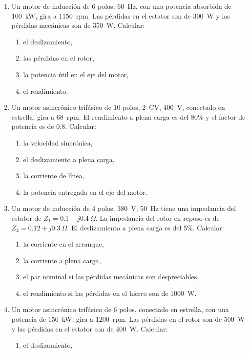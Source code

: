 \documentclass[../main]{subfiles}
\begin{document}
\begin{enumerate}
  \item Un motor de inducción de 6 polos, \qty{60}{Hz}, con una potencia absorbida de \qty{100}{kW}, gira a \qty{1150}{rpm}. Las pérdidas en el estator son de \qty{300}{W} y las pérdidas mecánicas son de \qty{350}{W}. Calcular:
    \begin{enumerate}
      \item el deslizamiento,
      \item las pérdidas en el rotor,
      \item la potencia útil en el eje del motor,
      \item el rendimiento.
    \end{enumerate}
  \item Un motor asincrónico trifásico de 10 polos, \qty{2}{CV}, \qty{400}{V}, conectado en estrella, gira a \qty{68}{rpm}. El rendimiento a plena carga es del 80\% y el factor de potencia es de 0.8. Calcular:
    \begin{enumerate}
      \item la velocidad sincrónica,
      \item el deslizamiento a plena carga,
      \item la corriente de línea,
      \item la potencia entregada en el eje del motor.
    \end{enumerate}
  \item Un motor de inducción de 4 polos, \qty{380}{V}, \qty{50}{Hz} tiene una impedancia del estator de $Z_1 = 0.1 + j0.4~\Omega$. La impedancia del rotor en reposo es de $Z_2 = 0.12 + j0.3~\Omega$. El deslizamiento a plena carga es del 5\%. Calcular:
    \begin{enumerate}
      \item la corriente en el arranque,
      \item la corriente a plena carga,
      \item el par nominal si las pérdidas mecánicas son despreciables,
      \item el rendimiento si las pérdidas en el hierro son de \qty{1000}{W}.
    \end{enumerate}
  \item Un motor asincrónico trifásico de 6 polos, conectado en estrella, con una potencia de \qty{150}{kW}, gira a \qty{1200}{rpm}. Las pérdidas en el rotor son de \qty{500}{W} y las pérdidas en el estator son de \qty{400}{W}. Calcular:
    \begin{enumerate}
      \item el deslizamiento,

\end{enumerate}
\end{enumerate}
\end{document}
